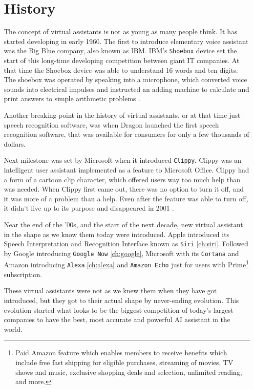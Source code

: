 \documentclass[
  digital, %
  oneside, %
  table,   %
  lof,     %
  lot,     %
]{fithesis3}
\begin{document}
\chapter{History}
The concept of virtual assistants is not as young as many people think. It has started developing in early 1960. The first to introduce elementary voice assistant was the Big Blue company, also known as IBM. IBM's \texttt{Shoebox} device set the start of this long-time developing competition between giant IT companies. At that time the Shoebox device was able to understand 16 words and ten digits. The shoebox was operated by speaking into a microphone, which converted voice sounds into electrical impulses and instructed an adding machine to calculate and print answers to simple arithmetic problems \parencite{shoebox}.

Another breaking point in the history of virtual assistants, or at that time just speech recognition software, was when Dragon launched the first speech recognition software, that was available for consumers for only a few thousands of dollars.

Next milestone was set by Microsoft when it introduced \texttt{Clippy}. Clippy was an intelligent user assistant implemented as a feature to Microsoft Office. Clippy had a form of a cartoon clip character, which offered users way too much help than was needed. When Clippy first came out, there was no option to turn it off, and it was more of a problem than a help. Even after the feature was able to turn off, it didn't live up to its purpose and disappeared in 2001 \parencite{clippy}.

Near the end of the '00s, and the start of the next decade, new virtual assistant in the shape as we know them today were introduced. Apple introduced its Speech Interpretation and Recognition Interface known as \texttt{Siri} \ref{ch:siri}. Followed by Google introducing \texttt{Google Now} \ref{ch:google}, Microsoft with its \texttt{Cortana} and Amazon introducing \texttt{Alexa} \ref{ch:alexa} and \texttt{Amazon Echo} just for users with Prime\footnote{Paid Amazon feature which enables members to receive benefits which include free fast shipping for eligible purchases, streaming of movies, TV shows and music, exclusive shopping deals and selection, unlimited reading, and more.} subscription.

These virtual assistants were not as we knew them when they have got introduced, but they got to their actual shape by never-ending evolution. This evolution started what looks to be the biggest competition of today's largest companies to have the best, most accurate and powerful AI assistant in the world.
\end{document}
